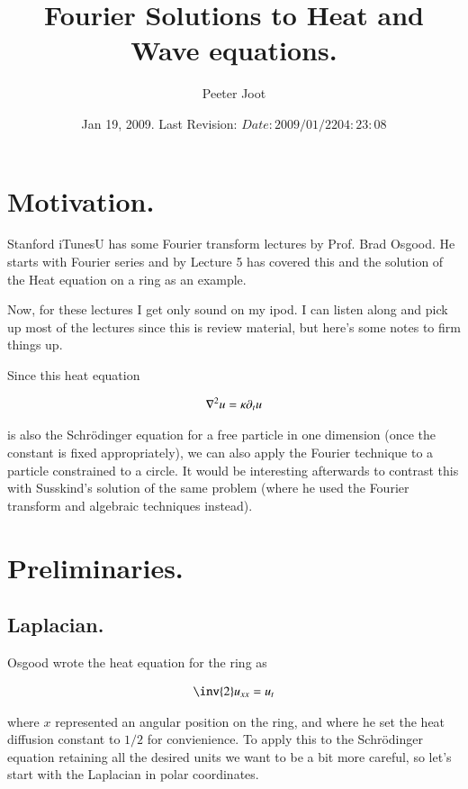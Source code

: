 \documentclass{article}
\title{ Fourier Solutions to Heat and Wave equations. }
\author{Peeter Joot}
\date{ Jan 19, 2009.  Last Revision: $Date: 2009/01/22 04:23:08 $ }
\begin{document}
\maketitle{}


\section{ Motivation. }

Stanford iTunesU has some Fourier transform lectures by Prof. Brad Osgood.
He starts with Fourier series and by Lecture 5 has covered this and
the solution of the Heat equation on a ring as an example.

Now, for these lectures I get only sound on my ipod.  I can listen along and
pick up most of the lectures since this is review material, but here's some
notes to firm things up.

Since this heat equation

\begin{align}
\nabla^2 u = \kappa \partial_t u
\end{align}

is also the Schr\"{o}dinger equation for a free particle in one 
dimension (once the 
constant is fixed appropriately), we can also apply the Fourier
technique to a particle
constrained to a circle.  It would be interesting afterwards to 
contrast this with Susskind's solution of the
same problem (where he used the Fourier transform and algebraic techniques
instead).

\section{ Preliminaries. }

\subsection{ Laplacian. }

Osgood wrote the heat equation for the ring as

\begin{align*}
\inv{2} u_{xx} = u_t
\end{align*}

where $x$ represented an angular position on the ring, and where
he set the heat diffusion constant to $1/2$ for convienience.
To apply this to the Schr\"{o}dinger equation retaining all the desired
units we want to be a bit more careful, so let's start with the Laplacian
in polar coordinates.
\end{document}
